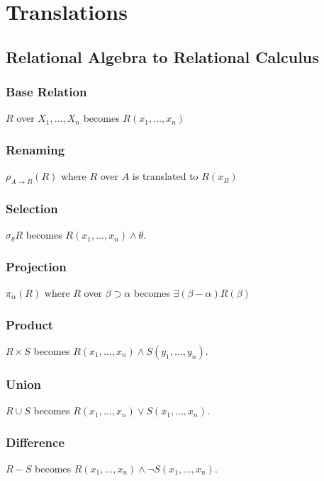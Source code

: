 \documentclass{article}
\begin{document}
\section{Translations}

\subsection{Relational Algebra to Relational Calculus}

\subsubsection*{Base Relation}

$R$ over $X_1,...,X_n$ becomes $R(x_1, \ldots, x_n)$

\subsubsection*{Renaming}
$\rho_{A\rightarrow B}(R)$ where $R$ over $A$ is translated to $R(x_B)$

\subsubsection*{Selection}
$\sigma_{\theta} R$ becomes $R(x_1, \ldots, x_n) \wedge \theta$.

\subsubsection*{Projection}
$\pi_{\alpha}(R)$ where $R$ over $\beta \supset \alpha$ becomes $\exists (\beta-\alpha) R(\beta)$

\subsubsection*{Product}
$R \times S$ becomes $R(x_1, \ldots, x_n) \wedge S(y_1, \ldots, y_n)$.

\subsubsection*{Union}
$R \cup S$ becomes $R(x_1, \ldots, x_n) \vee S(x_1, \ldots, x_n)$.

\subsubsection*{Difference}
$R - S$ becomes $R(x_1, \ldots, x_n) \wedge \neg S(x_1, \ldots, x_n)$.
\end{document}
